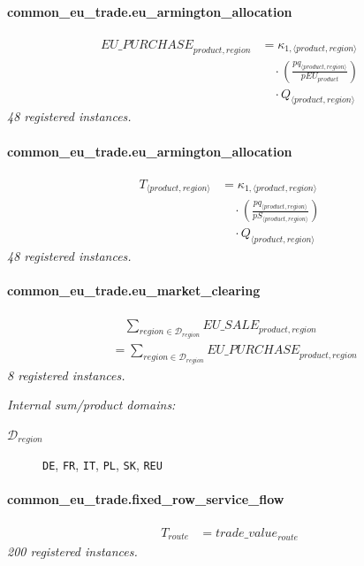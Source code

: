 \documentclass[11pt]{article}
\begin{document}
\paragraph{common\_eu\_trade.eu\_armington\_allocation}
\begin{align*}
{EU\_PURCHASE}_{product,region} &= \kappa_{1,\langle product, region\rangle}\\
&\quad {}\cdot (\frac{pq_{\langle product, region\rangle}}{pEU_{product}})\\
&\quad {}\cdot Q_{\langle product, region\rangle}
\end{align*}
\noindent\emph{48 registered instances.}\par
\paragraph{common\_eu\_trade.eu\_armington\_allocation}
\begin{align*}
T_{\langle product, region\rangle} &= \kappa_{1,\langle product, region\rangle}\\
&\quad {}\cdot (\frac{pq_{\langle product, region\rangle}}{pS_{\langle product, region\rangle}})\\
&\quad {}\cdot Q_{\langle product, region\rangle}
\end{align*}
\noindent\emph{48 registered instances.}\par
\paragraph{common\_eu\_trade.eu\_market\_clearing}
\begin{align*}
&\quad \sum_{region \in \mathcal{D}_{region}} {EU\_SALE}_{product,region}\\
&= \sum_{region \in \mathcal{D}_{region}} {EU\_PURCHASE}_{product,region}
\end{align*}
\noindent\emph{8 registered instances.}\par
\noindent\emph{Internal sum/product domains:}\par
\begin{description}
\item[\(\mathcal{D}_{region}\)] \texttt{DE}, \texttt{FR}, \texttt{IT}, \texttt{PL}, \texttt{SK}, \texttt{REU}
\end{description}
\paragraph{common\_eu\_trade.fixed\_row\_service\_flow}
\begin{align*}
T_{route} &= {trade\_value}_{route}
\end{align*}
\noindent\emph{200 registered instances.}\par
\end{document}
